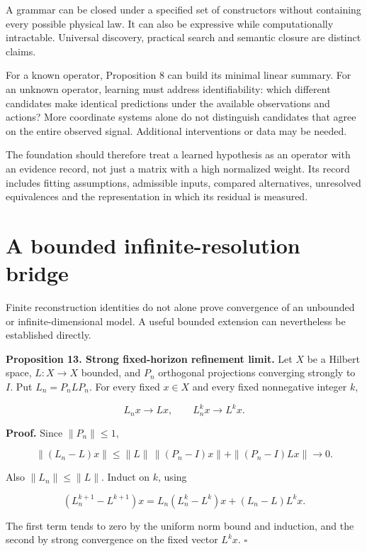 A grammar can be closed under a specified set of constructors without
containing every possible physical law. It can also be expressive while
computationally intractable. Universal discovery, practical search and
semantic closure are distinct claims.

For a known operator, Proposition 8 can build its minimal linear
summary. For an unknown operator, learning must address identifiability:
which different candidates make identical predictions under the
available observations and actions? More coordinate systems alone do not
distinguish candidates that agree on the entire observed signal.
Additional interventions or data may be needed.

The foundation should therefore treat a learned hypothesis as an
operator with an evidence record, not just a matrix with a high
normalized weight. Its record includes fitting assumptions, admissible
inputs, compared alternatives, unresolved equivalences and the
representation in which its residual is measured.

\section{A bounded infinite-resolution bridge}\label{LSM:a-bounded-infinite-resolution-bridge}

Finite reconstruction identities do not alone prove convergence of an
unbounded or infinite-dimensional model. A useful bounded extension can
nevertheless be established directly.

\textbf{Proposition 13. Strong fixed-horizon refinement limit.} Let
\(X\) be a Hilbert space, \(L:X\to X\) bounded, and \(P_n\) orthogonal
projections converging strongly to \(I\). Put \(L_n=P_nLP_n\). For every
fixed \(x\in X\) and every fixed nonnegative integer \(k\),

\[
L_nx\longrightarrow Lx,\qquad
L_n^kx\longrightarrow L^kx.
\]

\textbf{Proof.} Since \(\|P_n\|\leq1\),

\[
\|(L_n-L)x\|
\leq\|L\|\,\|(P_n-I)x\|+\|(P_n-I)Lx\|
\longrightarrow0.
\]

Also \(\|L_n\|\leq\|L\|\). Induct on \(k\), using

\[
(L_n^{k+1}-L^{k+1})x
=L_n(L_n^k-L^k)x+(L_n-L)L^kx.
\]

The first term tends to zero by the uniform norm bound and induction,
and the second by strong convergence on the fixed vector \(L^kx\).
\(\square\)

